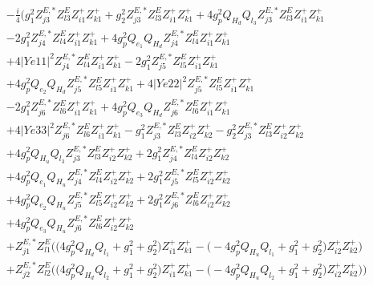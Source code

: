 \begin{align} 
 &-\frac{i}{4} \Big(g_{1}^{2} Z^{E,*}_{j 3} Z_{{l 3}}^{E} Z_{{i 1}}^{+} Z_{{k 1}}^{+} +g_{2}^{2} Z^{E,*}_{j 3} Z_{{l 3}}^{E} Z_{{i 1}}^{+} Z_{{k 1}}^{+} +4 g_{p}^{2} Q_{H_d} Q_{l_3} Z^{E,*}_{j 3} Z_{{l 3}}^{E} Z_{{i 1}}^{+} Z_{{k 1}}^{+} \nonumber \\ 
 &-2 g_{1}^{2} Z^{E,*}_{j 4} Z_{{l 4}}^{E} Z_{{i 1}}^{+} Z_{{k 1}}^{+} +4 g_{p}^{2} Q_{e_{1}} Q_{H_d} Z^{E,*}_{j 4} Z_{{l 4}}^{E} Z_{{i 1}}^{+} Z_{{k 1}}^{+} \nonumber \\ 
 &+4 |Ye11|^2 Z^{E,*}_{j 4} Z_{{l 4}}^{E} Z_{{i 1}}^{+} Z_{{k 1}}^{+} -2 g_{1}^{2} Z^{E,*}_{j 5} Z_{{l 5}}^{E} Z_{{i 1}}^{+} Z_{{k 1}}^{+} \nonumber \\ 
 &+4 g_{p}^{2} Q_{e_{2}} Q_{H_d} Z^{E,*}_{j 5} Z_{{l 5}}^{E} Z_{{i 1}}^{+} Z_{{k 1}}^{+} +4 |Ye22|^2 Z^{E,*}_{j 5} Z_{{l 5}}^{E} Z_{{i 1}}^{+} Z_{{k 1}}^{+} \nonumber \\ 
 &-2 g_{1}^{2} Z^{E,*}_{j 6} Z_{{l 6}}^{E} Z_{{i 1}}^{+} Z_{{k 1}}^{+} +4 g_{p}^{2} Q_{e_3} Q_{H_d} Z^{E,*}_{j 6} Z_{{l 6}}^{E} Z_{{i 1}}^{+} Z_{{k 1}}^{+} \nonumber \\ 
 &+4 |Ye33|^2 Z^{E,*}_{j 6} Z_{{l 6}}^{E} Z_{{i 1}}^{+} Z_{{k 1}}^{+} - g_{1}^{2} Z^{E,*}_{j 3} Z_{{l 3}}^{E} Z_{{i 2}}^{+} Z_{{k 2}}^{+} - g_{2}^{2} Z^{E,*}_{j 3} Z_{{l 3}}^{E} Z_{{i 2}}^{+} Z_{{k 2}}^{+} \nonumber \\ 
 &+4 g_{p}^{2} Q_{H_u} Q_{l_3} Z^{E,*}_{j 3} Z_{{l 3}}^{E} Z_{{i 2}}^{+} Z_{{k 2}}^{+} +2 g_{1}^{2} Z^{E,*}_{j 4} Z_{{l 4}}^{E} Z_{{i 2}}^{+} Z_{{k 2}}^{+} \nonumber \\ 
 &+4 g_{p}^{2} Q_{e_{1}} Q_{H_u} Z^{E,*}_{j 4} Z_{{l 4}}^{E} Z_{{i 2}}^{+} Z_{{k 2}}^{+} +2 g_{1}^{2} Z^{E,*}_{j 5} Z_{{l 5}}^{E} Z_{{i 2}}^{+} Z_{{k 2}}^{+} \nonumber \\ 
 &+4 g_{p}^{2} Q_{e_{2}} Q_{H_u} Z^{E,*}_{j 5} Z_{{l 5}}^{E} Z_{{i 2}}^{+} Z_{{k 2}}^{+} +2 g_{1}^{2} Z^{E,*}_{j 6} Z_{{l 6}}^{E} Z_{{i 2}}^{+} Z_{{k 2}}^{+} \nonumber \\ 
 &+4 g_{p}^{2} Q_{e_3} Q_{H_u} Z^{E,*}_{j 6} Z_{{l 6}}^{E} Z_{{i 2}}^{+} Z_{{k 2}}^{+} \nonumber \\ 
 &+Z^{E,*}_{j 1} Z_{{l 1}}^{E} \Big(\Big(4 g_{p}^{2} Q_{H_d} Q_{l_1}  + g_{1}^{2} + g_{2}^{2}\Big)Z_{{i 1}}^{+} Z_{{k 1}}^{+}  - \Big(-4 g_{p}^{2} Q_{H_u} Q_{l_1}  + g_{1}^{2} + g_{2}^{2}\Big)Z_{{i 2}}^{+} Z_{{k 2}}^{+} \Big)\nonumber \\ 
 &+Z^{E,*}_{j 2} Z_{{l 2}}^{E} \Big(\Big(4 g_{p}^{2} Q_{H_d} Q_{l_2}  + g_{1}^{2} + g_{2}^{2}\Big)Z_{{i 1}}^{+} Z_{{k 1}}^{+}  - \Big(-4 g_{p}^{2} Q_{H_u} Q_{l_2}  + g_{1}^{2} + g_{2}^{2}\Big)Z_{{i 2}}^{+} Z_{{k 2}}^{+} \Big)\Big)\end{align} 
